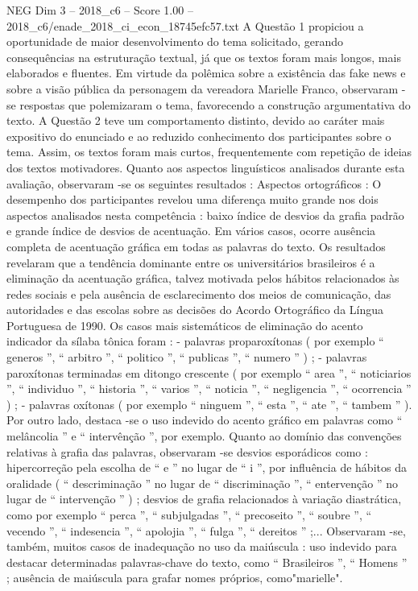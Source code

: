 \begin{textsample}{NEG Dim 3 – 2018\_c6 – Score 1.00 – 2018\_c6/enade\_2018\_ci\_econ\_18745efc57.txt}
A Questão 1 propiciou a oportunidade de maior desenvolvimento do tema solicitado, gerando consequências na estruturação textual, já que os textos foram mais longos, mais elaborados e fluentes.
Em virtude da polêmica sobre a existência das fake news e sobre a visão pública da personagem da vereadora Marielle Franco, observaram -se respostas que polemizaram o tema, favorecendo a construção argumentativa do texto.
A Questão 2 teve um comportamento distinto, devido ao caráter mais expositivo do enunciado e ao reduzido conhecimento dos participantes sobre o tema.
Assim, os textos foram mais curtos, frequentemente com repetição de ideias dos textos motivadores.
Quanto aos aspectos linguísticos analisados durante esta avaliação, observaram -se os seguintes resultados : Aspectos ortográficos : O desempenho dos participantes revelou uma diferença muito grande nos dois aspectos analisados nesta competência : baixo índice de desvios da grafia padrão e grande índice de desvios de acentuação.
Em vários casos, ocorre ausência completa de acentuação gráfica em todas as palavras do texto.
Os resultados revelaram que a tendência dominante entre os universitários brasileiros é a eliminação da acentuação gráfica, talvez motivada pelos hábitos relacionados às redes sociais e pela ausência de esclarecimento dos meios de comunicação, das autoridades e das escolas sobre as decisões do Acordo Ortográfico da Língua Portuguesa de 1990.
Os casos mais sistemáticos de eliminação do acento indicador da sílaba tônica foram : - palavras proparoxítonas ( por exemplo “ generos ”, “ arbitro ”, “ politico ”, “ publicas ”, “ numero ” ) ; - palavras paroxítonas terminadas em ditongo crescente ( por exemplo “ area ”, “ noticiarios ”, “ individuo ”, “ historia ”, “ varios ”, “ noticia ”, “ negligencia ”, “ ocorrencia ” ) ; - palavras oxítonas ( por exemplo “ ninguem ”, “ esta ”, “ ate ”, “ tambem ” ).
Por outro lado, destaca -se o uso indevido do acento gráfico em palavras como “ melâncolia ” e “ intervênção ”, por exemplo.
Quanto ao domínio das convenções relativas à grafia das palavras, observaram -se desvios esporádicos como : hipercorreção pela escolha de “ e ” no lugar de “ i ”, por influência de hábitos da oralidade ( “ descriminação ” no lugar de “ discriminação ”, “ entervenção ” no lugar de “ intervenção ” ) ; desvios de grafia relacionados à variação diastrática, como por exemplo “ perca ”, “ subjulgadas ”, “ precoseito ”, “ soubre ”, “ vecendo ”, “ indesencia ”, “ apolojia ”, “ fulga ”, “ dereitos ” ;...
Observaram -se, também, muitos casos de inadequação no uso da maiúscula : uso indevido para destacar determinadas palavras-chave do texto, como “ Brasileiros ”, “ Homens ” ; ausência de maiúscula para grafar nomes próprios, como"marielle".

\end{textsample}
